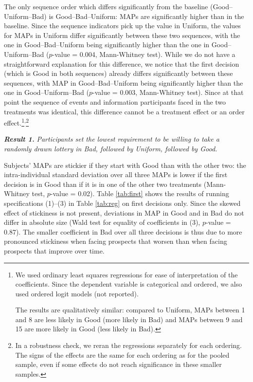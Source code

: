 The only sequence order which differs significantly from the baseline (Good--Uniform--Bad) is Good--Bad--Uniform: MAPs are significantly higher than in the baseline.
Since the sequence indicators pick up the value in Uniform, the values for MAPs in Uniform differ significantly between these two sequences, with the one in Good--Bad--Uniform being significantly higher than the one in Good--Uniform--Bad ($p$-value = 0.004, Mann-Whitney test).
While we do not have a straightforward explanation for this difference, we notice that the first decision (which is Good in both sequences) already differs significantly between these sequences, with MAP in Good--Bad--Uniform being significantly higher than the one in Good--Uniform--Bad ($p$-value = 0.003, Mann-Whitney test).
Since at that point the sequence of events and information participants faced in the two treatments was identical, this difference cannot be a treatment effect or an order effect.\footnote{
We used ordinary least squares regressions for ease of interpretation of the coefficients.
Since the dependent variable is categorical and ordered, we also used ordered logit models (not reported).

The results are qualitatively similar: compared to Uniform, MAPs between 1 and 8 are less likely in Good (more likely in Bad) and MAPs between 9 and 15 are more likely in Good (less likely in Bad).
}\textsuperscript{,}\footnote{
In a robustness check, we reran the regressions separately for each ordering.
The signs of the effects are the same for each ordering as for the pooled sample, even if some effects do not reach significance in these smaller samples.
}

\textbf{\textit{Result 1.}} \textit{Participants set the lowest requirement to be willing to take a randomly drawn lottery in Bad, followed by Uniform, followed by Good.}

Subjects' MAPs are stickier if they start with Good than with the other two: the intra-individual standard deviation over all three MAPs is lower if the first decision is in Good than if it is in one of the other two treatments (Mann-Whitney test, $p$-value = 0.02).
Table \ref{tab:first} shows the results of running specifications (1)--(3) in Table \ref{tab:reg} on first decisions only.
Since the skewed effect of stickiness is not present, deviations in MAP in Good and in Bad do not differ in absolute size (Wald test for equality of coefficients in (3), $p$-value = 0.87).
The smaller coefficient in Bad over all three decisions is thus due to more pronounced stickiness when facing prospects that worsen than when facing prospects that improve over time.

